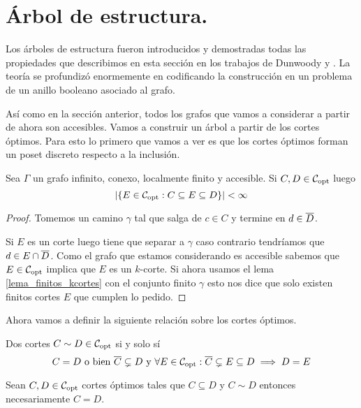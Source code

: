 \documentclass[tesis.tex]{subfiles}
\begin{document}
\section{Árbol de estructura.}


Los árboles de estructura fueron introducidos y demostradas todas las propiedades que describimos en esta sección en los trabajos de Dunwoody \cite{dunwoody1979accessibility} y \cite{dunwoody1982cutting}.
La teoría se profundizó enormemente en \cite{dicks1989groups} codificando la construcción en un problema de un anillo booleano asociado al grafo. 

Así como en la sección anterior, todos los grafos que vamos a considerar a partir de ahora son accesibles.
Vamos a construir un árbol a partir de los cortes óptimos.
Para esto lo primero que vamos a ver es que los cortes óptimos forman un poset discreto respecto a la inclusión.

\begin{lema}\label{lema_intermedios}
	Sea $\Gamma$ un grafo infinito, conexo, localmente finito y accesible.
	Si $C,D \in {\cal C}_{\text{opt}}$ luego 
	\[
	|\{ E \in {\cal C}_{\text{opt}} : C \subseteq E \subseteq D \}| < \infty
	\]
\end{lema}
\begin{proof}
	Tomemos un camino $\gamma$ tal que salga de $c \in C$ y termine en $d \in \overline D$.
	
	Si $E$ es un corte luego tiene que separar a $\gamma$ caso contrario tendríamos que $d \in E \cap \overline D$.
	Como el grafo que estamos considerando es accesible sabemos que $E \in {\cal C}_{\text{opt}}$ implica que $E$ es un $k$-corte.
	Si ahora usamos el lema \ref{lema_finitos_kcortes} con el conjunto finito $\gamma$ esto nos dice que solo existen finitos cortes $E$ que cumplen lo pedido.
\end{proof}



Ahora vamos a definir la siguiente relación sobre los cortes óptimos.

\begin{deff}
	Dos cortes $C \sim D \in {\cal C}_{\text{opt}}$ si y solo sí
	\[
		C = D \ \text{o bien} \ \overline C \subsetneq D \ \text{y} \ \forall E \in {\cal C}_{\text{opt}} : \overline C \subsetneq E \subseteq D \implies D = E
	\]
\end{deff}

\begin{obs}\label{obs_copt_igualdad}
	Sean $C,D \in {\cal C}_{\text{opt}}$ cortes óptimos tales que $C \subseteq D$ y $C \sim D$ entonces necesariamente $C = D$.
\end{obs}
\end{document}
